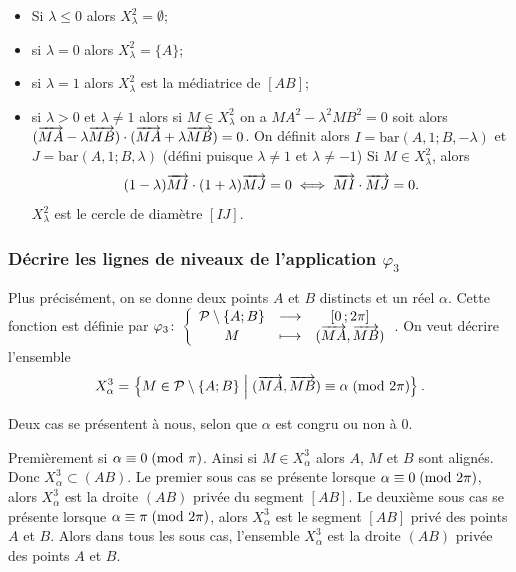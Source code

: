 \begin{itemize}
  \item Si \(\lambda \leqslant 0\) alors \(X_{\lambda}^2 = \emptyset\);
  \item si \(\lambda = 0\) alors \(X_{\lambda}^2 = \{A\}\);
  \item si \(\lambda = 1\) alors \(X_{\lambda}^2\) est la médiatrice de 
    \([AB]\);
  \item si \(\lambda > 0\) et \(\lambda \neq 1\) alors si \(M \in 
    X_{\lambda}^2\) on a \(MA^2 - \lambda^2 MB^2 = 0\) soit alors 
    \((\overrightarrow{MA}-\lambda \overrightarrow{MB}) \cdot (\overrightarrow{MA} + \lambda 
    \overrightarrow{MB}) = 0\). On définit alors \(I = \text{bar}(A , 1;B , 
    -\lambda)\) et \(J = \text{bar}(A , 1;B , \lambda)\) (défini puisque 
    \(\lambda \neq 1\) et \(\lambda \neq -1\))
    Si \(M \in X_{\lambda}^2\), alors
    \begin{equation}
      (1 - \lambda) \overrightarrow{MI} \cdot (1 + \lambda) \overrightarrow{MJ} = 0 \iff 
    \overrightarrow{MI} \cdot \overrightarrow{MJ} = 0.  \end{equation}
    \(X_{\lambda}^2\) est le cercle de diamètre \([IJ]\).
\end{itemize}

\subsubsection{Décrire les lignes de niveaux de l'application 
\(\varphi_3\)}

Plus précisément, on se donne deux points \(A\) et \(B\) distincts et un 
réel \(\alpha\). Cette fonction est définie par 
\(\varphi_3\colon \left\{\begin{array}{ccc} \mathcal{P}\setminus\{A;B\} & \longrightarrow &\left[ 0 \, ;  2\pi \right]\\ M & \longmapsto & (\overrightarrow{MA}, 
\overrightarrow{MB}) \end{array} \right.\). On veut décrire l'ensemble
\begin{equation}
  X_{\alpha}^3 = \left\{M \in 
  \mathcal{P}\setminus\{A;B\}\mathrel{}\middle|\mathrel{}(\overrightarrow{MA},\overrightarrow{MB}) \equiv \alpha\!\pmod {2\pi}\right\}.  
\end{equation}

Deux cas se présentent à nous, selon que \(\alpha\) est congru ou non à 0.

Premièrement si \(\alpha \equiv 0\!\pmod {\pi}\). Ainsi si \(M \in X_\alpha^3\) 
alors \(A\), \(M\) et \(B\) sont alignés. Donc \(X_\alpha^3 \subset (AB)\). Le 
premier sous cas se présente lorsque \(\alpha \equiv 0\!\pmod {2\pi}\), alors 
\(X_\alpha^3\) est la droite \((AB)\) privée du segment \([AB]\). Le deuxième 
sous cas se présente lorsque \(\alpha \equiv \pi\!\pmod {2\pi}\), alors  
\(X_\alpha^3\) est le segment \([AB]\) privé des points \(A\) et \(B\).  Alors 
dans tous les sous cas, l'ensemble \(X_\alpha^3\) est la droite \((AB)\) 
privée des points \(A\) et \(B\).

